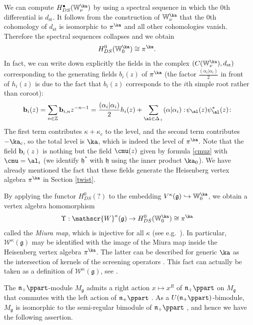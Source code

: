 \documentclass{amsart}
\newcommand{\Wak}[2]{\mathbb{W}_{#1}^{#2}}
\newcommand{\on}{\operatorname}
\newcommand{\+}{\mathop{\oplus}}
\renewcommand{\*}{{\otimes}}
\newcommand{\mf}{\mathfrak}
\newcommand{\g}{\mf{g}}
\newcommand{\h}{\mf{h}}
\newcommand{\Z}{\mathbb{Z}}
\newcommand{\W}{\mathscr{W}}
\newcommand{\ra}{\rightarrow}
\theoremstyle{theorem}
\theoremstyle{remark}
\numberwithin{equation}{section}
\begin{document}
We can compute $H^\bullet_{DS}(\Wak{\nu}{\ka})$ by using a spectral
sequence in which the $0$th differential is $d_{\on{st}}$. It follows
from the construction of $\Wak{\nu}{\ka}$ that the $0$th cohomology of
$d_{\on{st}}$ is isomorphic to $\pi^\ka$ and all other cohomologies
vanish. Therefore the spectral sequences collapses and we obtain
$$
H_{DS}^0(\Wak{0}{\ka})\cong \pi^\ka.
$$
In fact, we can write down explicitly the fields in the complex
$(C(\Wak{\nu}{\ka}),d_{\on{st}})$ corresponding to the generating
fields $b_i(z)$ of $\pi^\ka$ \cite{FF} (the factor
$\frac{(\alpha_i|\alpha_i)}{2}$ in front of $h_i(z)$ is due to the
fact that $b_i(z)$ corresponds to the $i$th simple root rather than
coroot):
\begin{equation}    \label{bf b}
{\mathbf b}_i(z) = \sum_{n \in \Z} {\mathbf b}_{i,n} z^{-n-1} =
\frac{(\alpha_i|\alpha_i)}{2} h_i(z) +
\sum_{\al \in \Delta_+} (\alpha|\alpha_i):\! \psi_\al(z)
\psi^*_\al(z) \! :
\end{equation}
The first term contributes $\kappa+\kappa_c$ to the level, and the
second term contributes $-\ka_c$, so the total level is $\ka$, which
is indeed the level of $\pi^\ka$. Note that the field ${\mathbf
  b}_i(z)$ is nothing but the field $\cmu(z)$ given by formula
\eqref{cmuz} with $\cmu=\al_i$ (we identify $\h^*$ with $\h$ using the
inner product $\ka_0$). We have already mentioned the fact that these
fields generate the Heisenberg vertex algebra $\pi^\ka$ in Section
\ref{twist}.

By applying the functor $H_{DS}^0(?)$ to the embedding
$V^\kappa(\g)\hookrightarrow \Wak{0}{\ka}$, we obtain a vertex algebra
homomorphism \cite{FF90,FF}
\begin{align}
\Upsilon:\W^\kappa(\g)\ra H_{DS}^0(\Wak{0}{\ka})\cong \pi^\ka
\label{eq:Miura}
\end{align}
called the {\em Miura map}, which is injective for all $\kappa$ (see
e.g.\ \cite{AraLec}).  In particular, $\W^\kappa(\g)$ may be
identified with the image of the Miura map inside the Heisenberg
vertex algebra $\pi^\ka$. The latter can be described for generic
$\ka$ as the intersection of kernels of the screening operators
\cite{FF}. This fact can actually be taken as a definition of
$\W^\kappa(\g)$, see \cite{FF93}.

The $\mf{n}_+\ppart$-module $M_\g$ admits a right action $x \mapsto
x^R$ of $\mf{n}_+\ppart$ on $M_\g$ that commutes with the left action
of $\mf{n}_+\ppart$ \cite{Fre05}.  As a $U(\mf{n}_+\ppart)$-bimodule,
$M_\g$ is isomorphic to the semi-regular bimodule of $\mf{n}_+\ppart$
\cite{Vor99,A-BGG}, and hence we have the following assertion.
 
\end{document}
